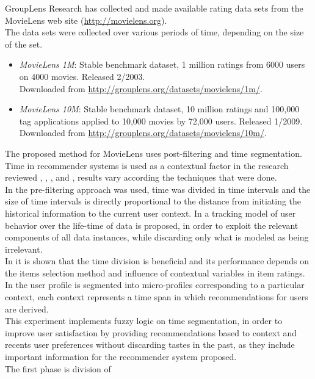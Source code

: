 GroupLens Research has collected and made available rating data sets
from the MovieLens web site (\url{http://movielens.org}). \\The data sets
were collected over various periods of time,  depending on the size of
the set.
\begin{itemize} 
\item \textit{MovieLens 1M}: Stable benchmark dataset, 
1 million ratings from 6000 users on 4000 movies.
Released 2/2003.\\ Downloaded from
\url{http://grouplens.org/datasets/movielens/1m/}. 
\item \textit{MovieLens 10M}: Stable benchmark dataset, 
10 million ratings and 100,000
tag applications applied to 10,000 movies by 72,000 users. 
Released 1/2009. \\Downloaded from
\url{http://grouplens.org/datasets/movielens/10m/}. 
\end{itemize}
The proposed method for MovieLens uses post-filtering 
and time segmentation.
Time in recommender systems is used  as a contextual factor in the
research reviewed \cite{baltrunas2009context},
\cite{baltrunas2009towards}, \cite{koren2010collaborative}, and
\cite{he2009time}, results vary according the techniques that were
done.\\  In \cite{he2009time} the pre-filtering approach was used, time
was divided in time intervals and the size of time intervals is
directly proportional to the distance from initiating the historical
information to the current user context. In
\cite{koren2010collaborative} a tracking model of user behavior over
the life-time of data is proposed, in order to exploit the relevant
components of all  data instances, while discarding only what is
modeled as being irrelevant.\\In \cite{baltrunas2009context} it is
shown that the time division is beneficial and its performance depends
on the items selection method and influence of contextual variables in
item ratings. In \cite{baltrunas2009towards} the user profile is
segmented into micro-profiles corresponding to a particular context,
each context represents a time span in which recommendations for users
are derived.\\This experiment implements fuzzy logic on time
segmentation, in order to improve user satisfaction by providing
recommendations based to context and recents user preferences without
discarding tastes in the past, as they include important information
for the recommender system proposed. \\The first phase is division of
